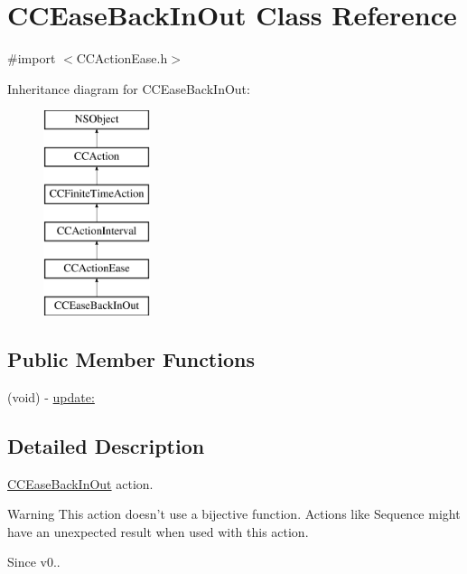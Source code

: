 \hypertarget{interface_c_c_ease_back_in_out}{\section{C\-C\-Ease\-Back\-In\-Out Class Reference}
\label{interface_c_c_ease_back_in_out}
}


{\ttfamily \#import $<$C\-C\-Action\-Ease.\-h$>$}

Inheritance diagram for C\-C\-Ease\-Back\-In\-Out\-:\begin{figure}[H]
\begin{center}
\leavevmode
\includegraphics[height=6.000000cm]{interface_c_c_ease_back_in_out}
\end{center}
\end{figure}
\subsection*{Public Member Functions}
\begin{DoxyCompactItemize}
\item 
(void) -\/ \hyperlink{interface_c_c_ease_back_in_out_ab51c7ffcd14a89520fbef572796930dd}{update\-:}
\end{DoxyCompactItemize}


\subsection{Detailed Description}
\hyperlink{interface_c_c_ease_back_in_out}{C\-C\-Ease\-Back\-In\-Out} action. \begin{DoxyWarning}{Warning}
This action doesn't use a bijective function. Actions like Sequence might have an unexpected result when used with this action. 
\end{DoxyWarning}
\begin{DoxySince}{Since}
v0.. 
\end{DoxySince}


